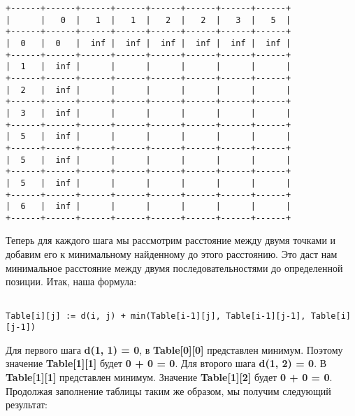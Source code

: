 \begin{tcolorbox}
\begin{verbatim}
+------+------+------+------+------+------+------+------+
|      |   0  |   1  |   1  |   2  |   2  |   3  |   5  |
+------+------+------+------+------+------+------+------+
|  0   |  0   |  inf |  inf |  inf |  inf |  inf |  inf |
+------+------+------+------+------+------+------+------+
|  1   |  inf |      |      |      |      |      |      |
+------+------+------+------+------+------+------+------+
|  2   |  inf |      |      |      |      |      |      |
+------+------+------+------+------+------+------+------+
|  3   |  inf |      |      |      |      |      |      |
+------+------+------+------+------+------+------+------+
|  5   |  inf |      |      |      |      |      |      |
+------+------+------+------+------+------+------+------+
|  5   |  inf |      |      |      |      |      |      |
+------+------+------+------+------+------+------+------+
|  5   |  inf |      |      |      |      |      |      |
+------+------+------+------+------+------+------+------+
|  6   |  inf |      |      |      |      |      |      |
+------+------+------+------+------+------+------+------+
\end{verbatim}
\end{tcolorbox}

\vspace{\baselineskip}
\vspace{-0.2cm}
Теперь для каждого шага мы рассмотрим расстояние между двумя точками и добавим его к минимальному найденному до этого расстоянию. Это даст нам минимальное расстояние между двумя последовательностями до определенной позиции. Итак, наша формула:

\vspace{\baselineskip}
\begin{tcolorbox}
\begin{verbatim}

Table[i][j] := d(i, j) + min(Table[i-1][j], Table[i-1][j-1], Table[i][j-1])

\end{verbatim}
\end{tcolorbox}

Для первого шага \textbf{d(1, 1) = 0}, в \textbf{Table[0][0]} представлен минимум. Поэтому значение \textbf{Table[1][1]} будет \textbf{0 + 0 = 0}. Для второго шага \textbf{d(1, 2) = 0}. В \textbf{Table[1][1]} представлен минимум. Значение \textbf{Table[1][2]} будет \textbf{0 + 0 = 0}. Продолжая заполнение таблицы таким же образом, мы получим следующий результат:

